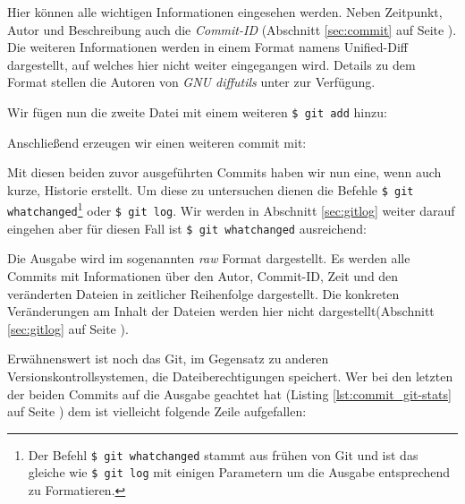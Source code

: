 

Hier können alle wichtigen Informationen eingesehen werden. Neben Zeitpunkt,
Autor und Beschreibung auch die \textit{Commit-ID} (Abschnitt \ref{sec:commit}
auf Seite \pageref{sec:commit}). Die weiteren Informationen werden in einem
Format namens Unified-Diff dargestellt, auf welches hier nicht weiter
eingegangen wird. Details zu dem Format stellen die Autoren von \textit{GNU
diffutils} unter \cite[S.~12-13]{paper:diffutils} zur Verfügung.

Wir fügen nun die zweite Datei mit einem weiteren \texttt{\$ git add} hinzu:



Anschließend erzeugen wir einen weiteren \gls{commit} mit:



Mit diesen beiden zuvor ausgeführten Commits haben wir nun eine, wenn auch
kurze, Historie erstellt. Um diese zu untersuchen dienen die Befehle \texttt{\$
git whatchanged}\footnote{Der Befehl \texttt{\$ git whatchanged} stammt aus
frühen von Git und ist das gleiche wie \texttt{\$ git log} mit einigen
Parametern um die Ausgabe entsprechend zu Formatieren.} oder \texttt{\$ git
log}. Wir werden in Abschnitt \ref{sec:gitlog} weiter darauf eingehen aber für
diesen Fall ist \texttt{\$ git whatchanged} ausreichend:



Die Ausgabe wird im sogenannten \textit{raw} Format dargestellt. Es werden alle
Commits mit Informationen über den Autor, Commit-ID, Zeit und den veränderten
Dateien in zeitlicher Reihenfolge dargestellt. Die konkreten Veränderungen am
Inhalt der Dateien werden hier nicht dargestellt(Abschnitt \ref{sec:gitlog} auf
Seite \pageref{sec:gitlog}).

Erwähnenswert ist noch das Git, im Gegensatz zu anderen
Versionskontrollsystemen, die Dateiberechtigungen speichert. Wer bei den
letzten der beiden Commits auf die Ausgabe geachtet hat (Listing
\ref{lst:commit_git-stats} auf Seite \pageref{lst:commit_git-stats}) dem ist
vielleicht folgende Zeile aufgefallen:

